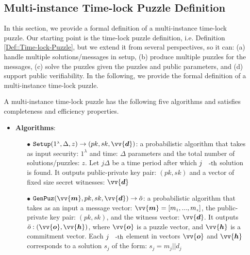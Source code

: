 \subsection{Multi-instance   Time-lock Puzzle Definition}\label{Section::Multi-instance-Time-lock Puzzle-Definition}
In this section, we provide a formal definition of a multi-instance time-lock puzzle. Our starting point is the  time-lock puzzle definition, i.e. Definition \ref{Def::Time-lock-Puzzle}, but we extend it from several  perspectives, so it can: (a) handle multiple  solutions/messages in setup, (b)  produce multiple puzzles for the messages,   (c) solve the puzzles given the puzzles and public parameters, and (d) support public verifiability. In the following, we provide the formal definition of a multi-instance  time-lock puzzle.
\begin{definition} A multi-instance time-lock puzzle has the following  five algorithms and satisfies completeness and efficiency properties. 
\begin{itemize}[leftmargin=.43cm]
\item \textbf{Algorithms}:
\begin{itemize} 
\item[$\bullet$]$\mathtt{Setup}(1^{\scriptscriptstyle\lambda},\Delta,z)\rightarrow (pk,sk,\vv{\bm{d}})$:  a probabilistic algorithm that takes as input  security: $1^{\scriptscriptstyle\lambda}$ and time:  $\Delta$ parameters and the total number of solutions/puzzles: $z$. Let     $j \Delta$ be a time period after which $j\text{\small{-th}}$ solution is found.   It outputs public-private key pair: $(pk,sk)$ and a vector of fixed size  secret witnesses: $\vv{\bm{d}}$


\item[$\bullet$]$\mathtt {GenPuz}(\vv{\bm{m}}, pk, sk,\vv{\bm{d}})\rightarrow \ddot{o}$:  a probabilistic algorithm that takes as an input  a  message vector: $\vv{\bm{m}}=[m_{\scriptscriptstyle 1},...,m_{\scriptscriptstyle z}]$,  the public-private key pair: $(pk,sk)$, and the witness vector: $\vv{\bm{d}}$. It  outputs $\ddot{o}:(\vv{\bm{o}},\vv{\bm{h}})$, where $\vv{\bm{o}}$ is a puzzle vector, and $\vv{\bm{h}}$ is a commitment vector. Each $j\text{\small{-th}}$ element in  vectors $\vv{\bm{o}}$ and $\vv{\bm{h}}$ corresponds to a solution $s_{\scriptscriptstyle j}$ of the form: $s_{\scriptscriptstyle j}=m_{\scriptscriptstyle j}||d_{\scriptscriptstyle j}$ %
 

\end{itemize}
\end{itemize}
\end{definition}
